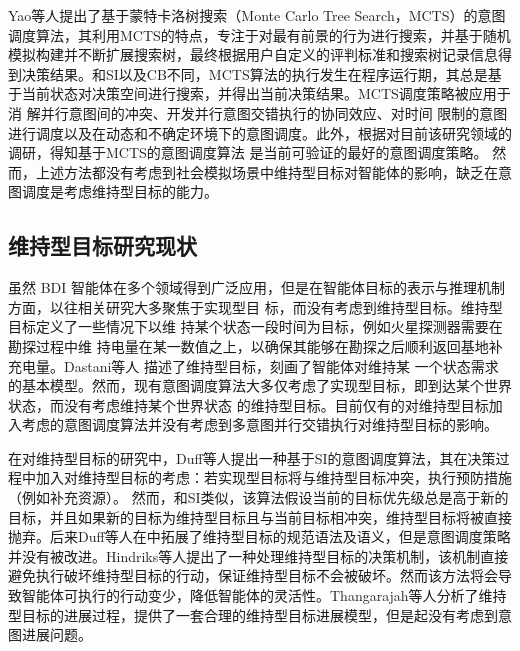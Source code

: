 Yao等人提出了基于蒙特卡洛树搜索（Monte Carlo Tree Search，MCTS）的意图调度算法\cite{DBLP:conf/aaai/YaoLT16,DBLP:conf/atal/YaoL16,DBLP:conf/ecai/YaoLT14,DBLP:conf/atal/Yao21,DBLP:conf/ijcai/Yao20,DBLP:conf/ecai/YaoLT16}，其利用MCTS的特点，专注于对最有前景的行为进行搜索，并基于随机模拟构建并不断扩展搜索树，最终根据用户自定义的评判标准和搜索树记录信息得到决策结果。和SI以及CB不同，MCTS算法的执行发生在程序运行期，其总是基于当前状态对决策空间进行搜索，并得出当前决策结果。MCTS调度策略被应用于消 解并行意图间的冲突、开发并行意图交错执行的协同效应、对时间 限制的意图进行调度以及在动态和不确定环境下的意图调度。此外，根据对目前该研究领域的调研，得知基于MCTS的意图调度算法 是当前可验证的最好的意图调度策略。
然而，上述方法都没有考虑到社会模拟场景中维持型目标对智能体的影响，缺乏在意图调度是考虑维持型目标的能力。


\subsection{维持型目标研究现状}
虽然 BDI 智能体在多个领域得到广泛应用，但是在智能体目标的表示与推理机制方面，以往相关研究大多聚焦于实现型目 标，而没有考虑到维持型目标。维持型目标定义了一些情况下以维 持某个状态一段时间为目标，例如火星探测器需要在勘探过程中维 持电量在某一数值之上，以确保其能够在勘探之后顺利返回基地补 充电量。Dastani等人\cite{DBLP:conf/atal/DastaniRM06} 描述了维持型目标，刻画了智能体对维持某 一个状态需求的基本模型。然而，现有意图调度算法大多仅考虑了实现型目标，即到达某个世界状态，而没有考虑维持某个世界状态 的维持型目标。目前仅有的对维持型目标加入考虑的意图调度算法\cite{DBLP:conf/atal/DuffHT06,DBLP:journals/ci/DuffTH14,DBLP:conf/dalt/HindriksR07}并没有考虑到多意图并行交错执行对维持型目标的影响。

在对维持型目标的研究中，Duff等人提出一种基于SI的意图调度算法\cite{DBLP:conf/atal/DuffHT06}，其在决策过程中加入对维持型目标的考虑：若实现型目标将与维持型目标冲突，执行预防措施（例如补充资源）。 然而，和SI类似，该算法假设当前的目标优先级总是高于新的目标，并且如果新的目标为维持型目标且与当前目标相冲突，维持型目标将被直接抛弃。后来Duff等人在\cite{DBLP:journals/ci/DuffTH14}中拓展了维持型目标的规范语法及语义，但是意图调度策略并没有被改进。Hindriks等人\cite{DBLP:conf/dalt/HindriksR07}提出了一种处理维持型目标的决策机制，该机制直接避免执行破坏维持型目标的行动，保证维持型目标不会被破坏。然而该方法将会导致智能体可执行的行动变少，降低智能体的灵活性。Thangarajah等人\cite{DBLP:conf/ecai/ThangarajahHMY14}分析了维持型目标的进展过程，提供了一套合理的维持型目标进展模型，但是起没有考虑到意图进展问题。

